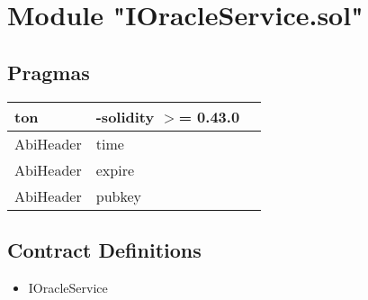 
\section{Module "IOracleService.sol"}


\subsection{Pragmas}


\noindent\begin{tabular}{|l|l|p{5cm}|}\hline
ton & -solidity $>$= 0.43.0 &\\\hline
AbiHeader &  time &\\\hline
AbiHeader &  expire &\\\hline
AbiHeader &  pubkey &\\\hline
\end{tabular}


\subsection{Contract Definitions}

\begin{itemize}
\item IOracleService
\end{itemize}
